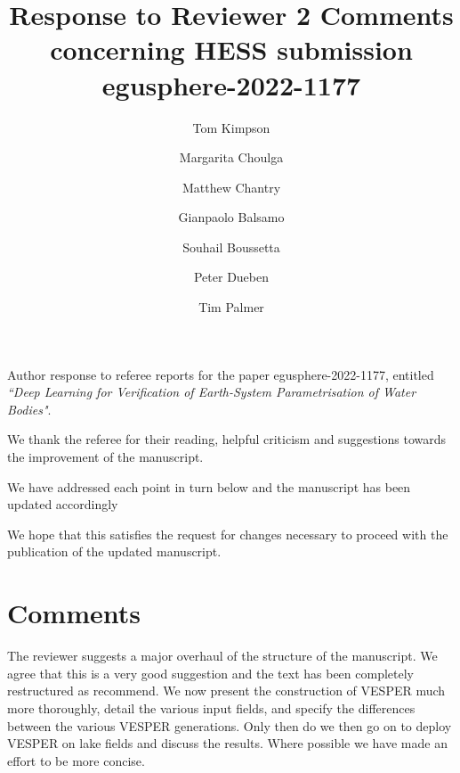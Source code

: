 \documentclass[10pt]{article}
\author{Tom Kimpson \\ 
	\and Margarita Choulga\\ 
 \and Matthew Chantry\\
\and Gianpaolo Balsamo\\  
 \and Souhail Boussetta\\
  \and Peter Dueben\\
   \and Tim Palmer\\
}
\title{\normalsize Response to Reviewer 2 Comments
  concerning HESS submission egusphere-2022-1177}
\begin{document}
	\maketitle
\noindent Author response to referee reports for the paper egusphere-2022-1177,
entitled \textit{``Deep Learning for Verification of Earth-System Parametrisation of Water Bodies"}. \newline 

\noindent We thank the referee for their reading, helpful criticism and suggestions towards the improvement of the manuscript. \newline 

\noindent We have addressed each point in turn below and the manuscript has been updated accordingly \newline 

\noindent  We hope that this satisfies the request for changes necessary to proceed with the publication of the updated manuscript. \newline 



\section*{Comments}
The reviewer suggests a major overhaul of the structure of the manuscript. We agree that this is a very good suggestion and the text has been completely restructured as recommend. We now present the construction of VESPER much more thoroughly, detail the various input fields, and specify the differences between the various VESPER generations.  Only then do we then go on to deploy VESPER on lake fields and discuss the results. Where possible we have made an effort to be more concise. 
\end{document}
